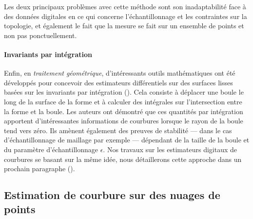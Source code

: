 Les deux principaux problèmes avec cette méthode sont son inadaptabilité face à
des données digitales en ce qui concerne l'échantillonnage et les contraintes
sur la topologie, et également le fait que la mesure se fait sur un ensemble de
points et non pas ponctuellement.
%
\paragraph{Invariants par intégration}
%
Enfin, en \emph{traitement géométrique}, d'intéressants outils mathématiques ont
été développés pour concevoir des estimateurs différentiels sur des surfaces
lisses basées sur les invariants par intégration
(). Cela consiste à déplacer une
boule le long de la surface de la forme et à calculer des intégrales sur
l'intersection entre la forme et la boule. Les auteurs ont démontré que ces
quantités par intégration apportent d'intéressantes informations de courbures
lorsque le rayon de la boule tend vers zéro. Ils amènent également des preuves
de stabilité --- dans le cas d'échantillonnage de maillage par exemple ---
dépendant de la taille de la boule et du paramètre d'échantillonnage $\epsilon$.
Nos travaux sur les estimateurs digitaux de courbures se basant sur la même
idée, nous détaillerons cette approche dans un prochain paragraphe
().
%
\subsection{Estimation de courbure sur des nuages de points}
%

